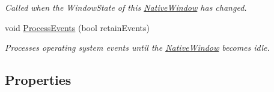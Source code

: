 \begin{DoxyCompactItemize}
\begin{DoxyCompactList}\small\item\em Called when the Window\-State of this \hyperlink{class_open_t_k_1_1_native_window}{Native\-Window} has changed. \end{DoxyCompactList}\item 
void \hyperlink{class_open_t_k_1_1_native_window_ab685ecac14ba8ea985e3c67a877ab41c}{Process\-Events} (bool retain\-Events)
\begin{DoxyCompactList}\small\item\em Processes operating system events until the \hyperlink{class_open_t_k_1_1_native_window}{Native\-Window} becomes idle. \end{DoxyCompactList}\end{DoxyCompactItemize}
\subsection*{Properties}
